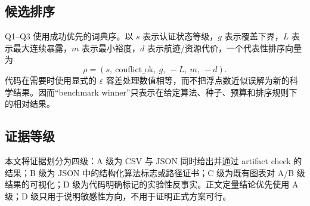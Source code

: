 \subsection{候选排序}

Q1--Q3 使用成功优先的词典序。以 $s$ 表示认证状态等级，$g$ 表示覆盖下界，$L$ 表示最大连续暴露，$m$ 表示最小裕度，$d$ 表示航迹/资源代价，一个代表性排序向量为
\begin{equation}
  \rho=(s,\ \mathrm{conflict\_ok},\ g,\ -L,\ m,\ -d).
  \label{eq:lexicographic-rank}
\end{equation}
代码在需要时使用显式的 $\varepsilon$ 容差处理数值相等，而不把浮点数近似误解为新的科学结果。因而“benchmark winner”只表示在给定算法、种子、预算和排序规则下的相对结果。

\subsection{证据等级}

本文将证据划分为四级：A 级为 CSV 与 JSON 同时给出并通过 artifact check 的结果；B 级为 JSON 中的结构化算法标志或路径证书；C 级为既有图表对 A/B 级结果的可视化；D 级为代码明确标记的实验性反事实。正文定量结论优先使用 A 级；D 级只用于说明敏感性方向，不用于证明正式方案可行。
